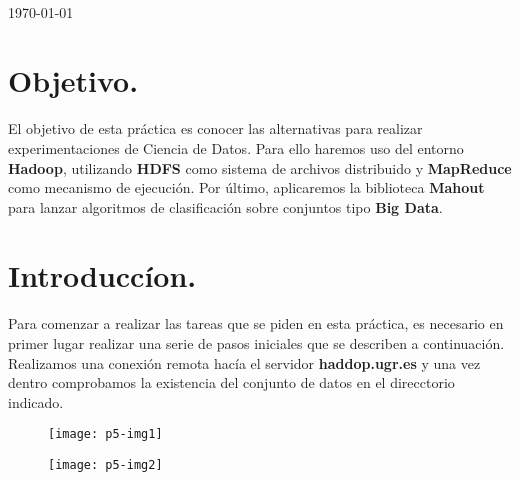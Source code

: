 \documentclass[10pt]{article}
\begin{document}
\begin{center}
 		\\																		%
\vspace{2cm} 																				
\begin{center}																					
{\large \today}																	%
 			\end{center}												  						
\end{center}							 											
																					
\newpage																		

\tableofcontents 

\newpage

\section{Objetivo.}
El objetivo de esta práctica es conocer las alternativas para realizar experimentaciones de Ciencia de Datos. Para ello haremos uso del entorno \textbf{Hadoop}, utilizando \textbf{HDFS} como sistema de archivos distribuido y \textbf{MapReduce} como mecanismo de ejecución. Por último, aplicaremos la biblioteca \textbf{Mahout} para lanzar algoritmos de clasificación sobre conjuntos tipo \textbf{Big Data}.


\section{Introduccíon.}
Para comenzar a realizar las tareas  que se piden en esta práctica, es necesario en primer lugar realizar una serie de pasos iniciales que se describen a continuación. \\

Realizamos una conexión remota hacía el servidor \textbf{haddop.ugr.es} y una vez dentro comprobamos la existencia del conjunto de datos en el direcctorio indicado. \\

 \begin{figure}[H]
	\begin{center}
 		\texttt{[image: p5-img1]}
	\end{center} 
\end{figure}

 \begin{figure}[H]
	\begin{center}
 		\texttt{[image: p5-img2]}
	\end{center} 
\end{figure}
\end{document}
